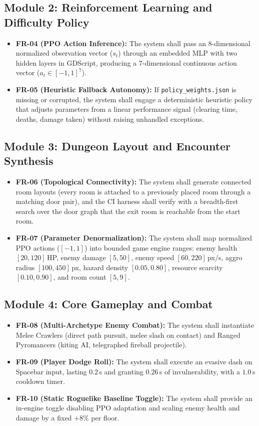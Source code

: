 \subsection{Module 2: Reinforcement Learning and Difficulty Policy}
\begin{itemize}
    \item \textbf{FR-04 (PPO Action Inference):} The system shall pass an 8-dimensional normalized observation vector ($s_t$) through an embedded MLP with two hidden layers in GDScript, producing a 7-dimensional continuous action vector ($a_t \in [-1, 1]^7$).
    \item \textbf{FR-05 (Heuristic Fallback Autonomy):} If \texttt{policy\_weights.json} is missing or corrupted, the system shall engage a deterministic heuristic policy that adjusts parameters from a linear performance signal (clearing time, deaths, damage taken) without raising unhandled exceptions.
\end{itemize}

\subsection{Module 3: Dungeon Layout and Encounter Synthesis}
\begin{itemize}
    \item \textbf{FR-06 (Topological Connectivity):} The system shall generate connected room layouts (every room is attached to a previously placed room through a matching door pair), and the CI harness shall verify with a breadth-first search over the door graph that the exit room is reachable from the start room.
    \item \textbf{FR-07 (Parameter Denormalization):} The system shall map normalized PPO actions ($[-1, 1]$) into bounded game engine ranges: enemy health $[20, 120]$\,HP, enemy damage $[5, 50]$, enemy speed $[60, 220]$\,px/s, aggro radius $[100, 450]$\,px, hazard density $[0.05, 0.80]$, resource scarcity $[0.10, 0.90]$, and room count $[5, 9]$.
\end{itemize}

\subsection{Module 4: Core Gameplay and Combat}
\begin{itemize}
    \item \textbf{FR-08 (Multi-Archetype Enemy Combat):} The system shall instantiate Melee Crawlers (direct path pursuit, melee slash on contact) and Ranged Pyromancers (kiting AI, telegraphed fireball projectile).
    \item \textbf{FR-09 (Player Dodge Roll):} The system shall execute an evasive dash on Spacebar input, lasting $0.2$\,s and granting $0.26$\,s of invulnerability, with a $1.0$\,s cooldown timer.
    \item \textbf{FR-10 (Static Roguelike Baseline Toggle):} The system shall provide an in-engine toggle disabling PPO adaptation and scaling enemy health and damage by a fixed $+8\%$ per floor.
\end{itemize}

